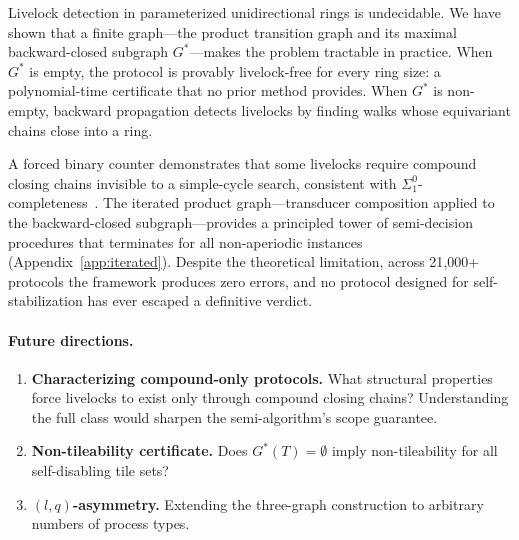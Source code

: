 \documentclass[11pt]{article}
\begin{document}
Livelock detection in parameterized unidirectional rings is undecidable. We have shown that a finite graph---the product transition graph and its maximal backward-closed subgraph $G^*$---makes the problem tractable in practice. When $G^*$ is empty, the protocol is provably livelock-free for every ring size: a polynomial-time certificate that no prior method provides. When $G^*$ is non-empty, backward propagation detects livelocks by finding walks whose equivariant chains close into a ring.

A forced binary counter demonstrates that some livelocks require compound closing chains invisible to a simple-cycle search, consistent with $\Sigma^0_1$-completeness~\cite{mazoyer-rapaport}. The iterated product graph---transducer composition applied to the backward-closed subgraph---provides a principled tower of semi-decision procedures that terminates for all non-aperiodic instances (Appendix~\ref{app:iterated}). Despite the theoretical limitation, across 21{,}000+ protocols the framework produces zero errors, and no protocol designed for self-stabilization has ever escaped a definitive verdict.

\paragraph{Future directions.}
\begin{enumerate}[nosep]
\item \textbf{Characterizing compound-only protocols.} What structural properties force livelocks to exist only through compound closing chains? Understanding the full class would sharpen the semi-algorithm's scope guarantee.

\item \textbf{Non-tileability certificate.} Does $G^*(T) = \emptyset$ imply non-tileability for all self-disabling tile sets?

\item \textbf{$(l,q)$-asymmetry.} Extending the three-graph construction to arbitrary numbers of process types.
\end{enumerate}


\appendix
\end{document}
